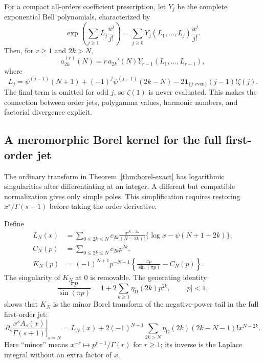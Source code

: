 \documentclass[11pt,a4paper]{article}
\numberwithin{equation}{section}
\theoremstyle{definition}
\theoremstyle{remark}
\begin{document}
For a compact all-orders coefficient prescription, let $Y_j$ be the
complete exponential Bell polynomials, characterized by
\[
 \exp\left(\sum_{j\geq1}L_j\frac{u^j}{j!}\right)
 =\sum_{j\geq0}Y_j(L_1,\ldots,L_j)\frac{u^j}{j!}.
\]
Then, for $r\geq1$ and $2k>N$,
\begin{equation}\label{eq:borel-bell-coeff}
 a_{2k}^{(r)}(N)=r\,a_{2k}'(N)
   Y_{r-1}(L_1,\ldots,L_{r-1}),
\end{equation}
where
\begin{equation}\label{eq:borel-Lj}
 L_j=\psi^{(j-1)}(N+1)+(-1)^j\psi^{(j-1)}(2k-N)
 -2\mathbf 1_{\{j\text{ even}\}}(j-1)!\zeta(j).
\end{equation}
The final term is omitted for odd $j$, so $\zeta(1)$ is never evaluated.
This makes the connection between order jets, polygamma values, harmonic
numbers, and factorial divergence explicit.

\subsection{A meromorphic Borel kernel for the full first-order jet}

The ordinary transform in Theorem~\ref{thm:borel-exact} has logarithmic
singularities after differentiating at an integer. A different but
compatible normalization gives only simple poles. This simplification
requires restoring $x^s/\Gamma(s+1)$ before taking the order derivative.

Define
\begin{align}
 L_N(x)&=\sum_{0\leq2k\leq N}c_{2k}
 \frac{x^{N-2k}}{(N-2k)!}
 \{\log x-\psi(N+1-2k)\},\label{eq:borel-LN}\\
 C_N(p)&=\sum_{0\leq2k\leq N}c_{2k}p^{2k},\label{eq:borel-CN}\\
 K_N(p)&=(-1)^{N+1}p^{-N-1}
 \left\{\frac{\pi p}{\sin(\pi p)}-C_N(p)\right\}.
 \label{eq:borel-KN}
\end{align}
The singularity of $K_N$ at $0$ is removable. The generating identity
\begin{equation}\label{eq:borel-csc-generating}
 \frac{\pi p}{\sin(\pi p)}=1+2\sum_{k\geq1}\eta_{\mathrm D}(2k)p^{2k},
 \qquad |p|<1,
\end{equation}
shows that $K_N$ is the minor Borel transform of the negative-power tail
in the full first-order jet:
\begin{equation}\label{eq:borel-jet-formal}
 \left.\partial_s\frac{x^sA_s(x)}{\Gamma(s+1)}\right|_{s=N}
 =L_N(x)+2(-1)^{N+1}\sum_{2k>N}
 \eta_{\mathrm D}(2k)(2k-N-1)!x^{N-2k}.
\end{equation}
Here ``minor'' means $x^{-r}\mapsto p^{r-1}/\Gamma(r)$ for $r\geq1$;
its inverse is the Laplace integral without an extra factor of $x$.
\end{document}
